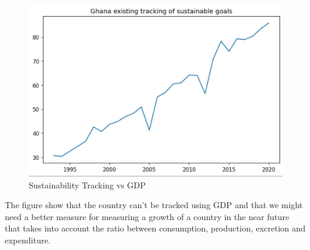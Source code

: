 \documentclass[conference]{IEEEtran}
\begin{document}
\begin{figure}[htbp]
    \centerline{\includegraphics[scale=0.37]{sustainability1.jpg}}
    \caption{Sustainability Tracking vs GDP}
\end{figure}
The figure show that the country can't be tracked using GDP and that we might need a better measure for measuring a growth of a country in the near future that takes into account the ratio between consumption, production, excretion and expenditure.
\bigskip
\end{document}
